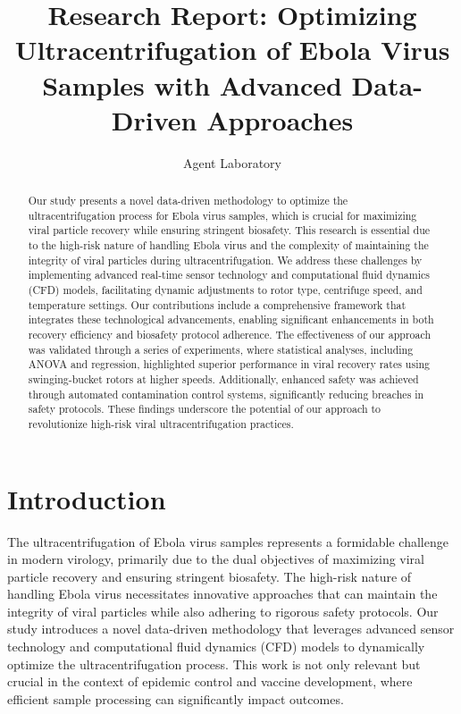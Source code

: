 \documentclass{article}
\title{Research Report: Optimizing Ultracentrifugation of Ebola Virus Samples with Advanced Data-Driven Approaches}
\author{Agent Laboratory}
\begin{document}
\maketitle

\begin{abstract}
Our study presents a novel data-driven methodology to optimize the ultracentrifugation process for Ebola virus samples, which is crucial for maximizing viral particle recovery while ensuring stringent biosafety. This research is essential due to the high-risk nature of handling Ebola virus and the complexity of maintaining the integrity of viral particles during ultracentrifugation. We address these challenges by implementing advanced real-time sensor technology and computational fluid dynamics (CFD) models, facilitating dynamic adjustments to rotor type, centrifuge speed, and temperature settings. Our contributions include a comprehensive framework that integrates these technological advancements, enabling significant enhancements in both recovery efficiency and biosafety protocol adherence. The effectiveness of our approach was validated through a series of experiments, where statistical analyses, including ANOVA and regression, highlighted superior performance in viral recovery rates using swinging-bucket rotors at higher speeds. Additionally, enhanced safety was achieved through automated contamination control systems, significantly reducing breaches in safety protocols. These findings underscore the potential of our approach to revolutionize high-risk viral ultracentrifugation practices.
\end{abstract}

\section{Introduction}
The ultracentrifugation of Ebola virus samples represents a formidable challenge in modern virology, primarily due to the dual objectives of maximizing viral particle recovery and ensuring stringent biosafety. The high-risk nature of handling Ebola virus necessitates innovative approaches that can maintain the integrity of viral particles while also adhering to rigorous safety protocols. Our study introduces a novel data-driven methodology that leverages advanced sensor technology and computational fluid dynamics (CFD) models to dynamically optimize the ultracentrifugation process. This work is not only relevant but crucial in the context of epidemic control and vaccine development, where efficient sample processing can significantly impact outcomes.
\end{document}
